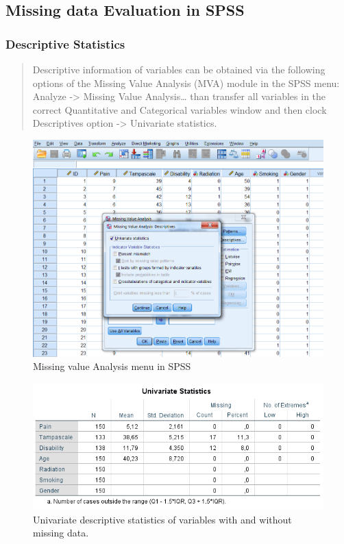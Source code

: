 \documentclass[]{book}
\begin{document}
\subsection{Missing data Evaluation in
SPSS}\label{missing-data-evaluation-in-spss}

\subsubsection{Descriptive Statistics}\label{descriptive-statistics}

\begin{quote}
Descriptive information of variables can be obtained via the following
options of the Missing Value Analysis (MVA) module in the SPSS menu:
Analyze -\textgreater{} Missing Value Analysis\ldots{} than transfer all
variables in the correct Quantitative and Categorical variables window
and then clock Descriptives option -\textgreater{} Univariate
statistics.
\end{quote}

\begin{figure}

{\centering \includegraphics[width=0.9\linewidth]{images/fig2.10} 

}

\caption{Missing value Analysis menu in SPSS}\label{fig:fig38}
\end{figure}

\begin{figure}

{\centering \includegraphics[width=0.9\linewidth]{images/tab2.4} 

}

\caption{Univariate descriptive statistics of variables with and without missing data.}\label{fig:tab4}
\end{figure}
\end{document}
